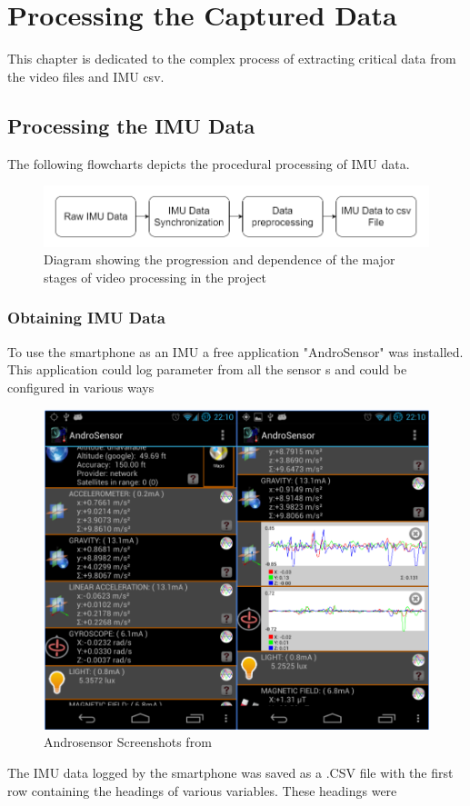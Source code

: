 \chapter{Processing the Captured Data}
This chapter is dedicated to the complex process of extracting critical data from the video files and IMU csv. 

\section{Processing the IMU Data}
The following flowcharts depicts the procedural processing of IMU data.
\begin{figure}[!ht]
  \includegraphics[width=\linewidth]{figures/imuflow.png}
  \caption{Diagram showing the progression and dependence of the major stages of video processing in the project}
  \label{fig:imuflow}
\end{figure}

\subsection{Obtaining IMU Data}
To use the smartphone as an IMU a free application "AndroSensor" \cite{androsensor} was installed. This application could log parameter from all the  sensor s and could be configured in various ways

\begin{figure}[!ht] 
\captionsetup{width=0.5\linewidth, font=small}  
\includegraphics[width=0.5\linewidth]{figures/as.png}
\caption{Androsensor Screenshots from \cite{androsensor}}
\label{fig:as}
\end{figure}

The IMU data logged by the smartphone was saved as a .CSV file with the first row containing the headings of various variables. These headings were

